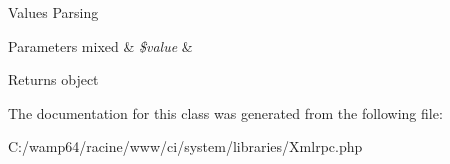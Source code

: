 Values Parsing


\begin{DoxyParams}[1]{Parameters}
mixed & {\em \$value} & \\
\hline
\end{DoxyParams}
\begin{DoxyReturn}{Returns}
object 
\end{DoxyReturn}


The documentation for this class was generated from the following file\+:\begin{DoxyCompactItemize}
\item 
C\+:/wamp64/racine/www/ci/system/libraries/Xmlrpc.\+php\end{DoxyCompactItemize}
